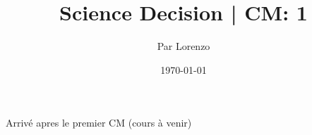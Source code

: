 \documentclass[a4paper, 12pt]{report}
\title{Science Decision | CM: 1}
\author{Par Lorenzo}
\date{\today}
\begin{document}
\maketitle

Arrivé apres le premier CM (cours à venir)
\end{document}
